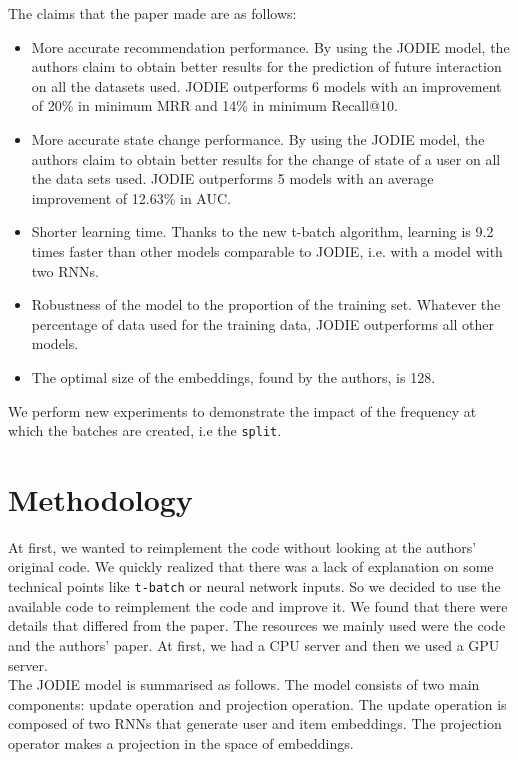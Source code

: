 The claims that the paper made are as follows:
\begin{itemize}
    \item More accurate recommendation performance. By using the JODIE model, the authors claim to obtain better results for the prediction of future interaction on all the datasets used. JODIE outperforms 6 models with an improvement of 20\% in minimum MRR and 14\% in minimum Recall@10.
    \item More accurate state change performance. By using the JODIE model, the authors claim to obtain better results for the change of state of a user on all the data sets used. JODIE outperforms 5 models with an average improvement of 12.63\% in AUC.
    \item Shorter learning time. Thanks to the new t-batch algorithm, learning is 9.2 times faster than other models comparable to JODIE, i.e. with a model with two RNNs.
    \item Robustness of the model to the proportion of the training set. Whatever the percentage of data used for the training data, JODIE outperforms all other models.
    \item The optimal size of the embeddings, found by the authors, is 128.
\end{itemize}

We perform new experiments to demonstrate the impact of the frequency at which the batches are created, i.e the \texttt{split}.
\section*{Methodology}

At first, we wanted to reimplement the code without looking at the authors' original code. We quickly realized that there was a lack of explanation on some technical points like \texttt{t-batch} or neural network inputs. So we decided to use the available code to reimplement the code and improve it. We found that there were details that differed from the paper. The resources we mainly used were the code and the authors' paper. At first, we had a CPU server and then we used a GPU server.\\

The JODIE model is summarised as follows. The model consists of two main components: update operation and projection operation. The update operation is composed of two RNNs that generate user and item embeddings. The projection operator makes a projection in the space of embeddings.

